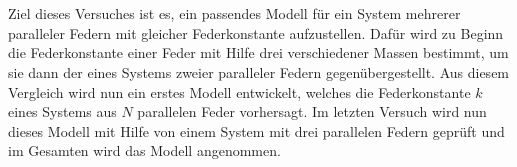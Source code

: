 \section*{\abstractname}
\label{sec:zusammenfassung}


Ziel dieses Versuches ist es, ein passendes Modell für ein System mehrerer paralleler Federn mit gleicher Federkonstante aufzustellen. Dafür wird zu Beginn die Federkonstante einer Feder mit Hilfe drei verschiedener Massen bestimmt, um sie dann der eines Systems zweier paralleler Federn gegenübergestellt. Aus diesem Vergleich wird nun ein erstes Modell entwickelt, welches die Federkonstante $k$ eines Systems aus $N$ parallelen Feder vorhersagt. Im letzten Versuch wird nun dieses Modell mit Hilfe von einem System mit drei parallelen Federn geprüft und im Gesamten wird das Modell angenommen.

\vspace{3cm}
